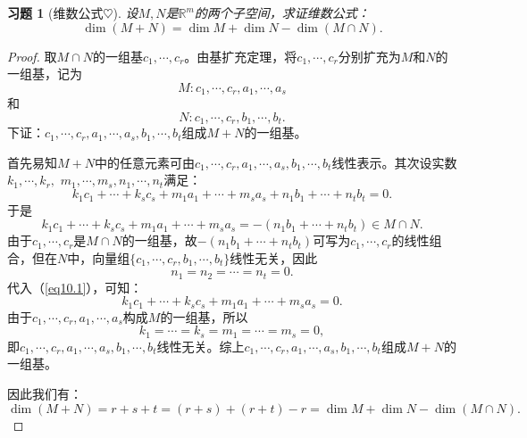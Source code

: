 \documentclass[UTF8]{ctexart}
\newtheorem{ex}[thm]{习题}
\begin{document}
\begin{ex}[维数公式$\heartsuit $]
设$M, N$是$\mathbb{R}^m$的两个子空间，求证维数公式：
\[
\dim(M+N) = \dim M + \dim N - \dim (M \cap N).
\]
\end{ex}
\begin{proof}
取$M \cap N$的一组基$c_1, \cdots, c_r$。由基扩充定理，将$c_1, \cdots, c_r$分别扩充为$M$和$N$的一组基，记为
\[
M: c_1, \cdots, c_r, a_1, \cdots, a_s
\]
和
\[
N: c_1, \cdots, c_r, b_1, \cdots, b_t.
\]
下证：$c_1, \cdots, c_r, a_1, \cdots, a_s, b_1, \cdots, b_t$组成$M+N$的一组基。
\

首先易知$M+N$中的任意元素可由$c_1, \cdots, c_r, a_1, \cdots, a_s, b_1, \cdots, b_t$线性表示。其次设实数$k_1, \cdots, k_r,$ $m_1, \cdots, m_s, n_1, \cdots, n_t$满足：
\begin{equation} \label{eq10.1}
k_1c_1 + \cdots + k_sc_s + m_1 a_1 + \cdots + m_s a_s + n_1 b_1 + \cdots + n_tb_t = 0.
\end{equation}
于是
\[
k_1c_1 + \cdots + k_sc_s + m_1 a_1 + \cdots + m_s a_s = -(n_1 b_1 + \cdots + n_tb_t) \in M \cap N.
\]
由于$c_1, \cdots, c_r$是$M \cap N$的一组基，故$-(n_1 b_1 + \cdots + n_tb_t)$可写为$c_1, \cdots, c_r$的线性组合，但在$N$中，向量组$\{c_1, \cdots, c_r, b_1, \cdots, b_t\}$线性无关，因此
\[
n_1 = n_2 = \cdots = n_t = 0.
\]
代入（\ref{eq10.1}），可知：
\[
k_1c_1 + \cdots + k_sc_s + m_1 a_1 + \cdots + m_s a_s = 0.
\]
由于$c_1, \cdots, c_r, a_1, \cdots, a_s$构成$M$的一组基，所以
\[
k_1 = \cdots = k_s = m_1 = \cdots =m_s = 0,
\]
即$c_1, \cdots, c_r, a_1, \cdots, a_s, b_1, \cdots, b_t$线性无关。综上$c_1, \cdots, c_r, a_1, \cdots, a_s, b_1, \cdots, b_t$组成$M+N$的一组基。
\

因此我们有：
\[
\dim(M+N) = r+s+t = (r+s) + (r+t) - r = \dim M + \dim N - \dim (M \cap N).
\]
\end{proof}



\end{document}
